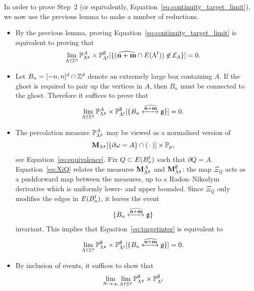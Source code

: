 In order to prove Step~2 (or equivalently, Equation~\eqref{eq:continuity_target_limit}),
we now use the previous lemma to make a number of reductions.
\begin{itemize}
    \item By the previous lemma,
        proving Equation~\eqref{eq:continuity_target_limit} is equivalent to proving that
        \[
            \lim_{\Lambda\uparrow\mathbb Z^d}
            \mathbb P_{\Lambda^\mathfrak g}^A\times\mathbb P_{\Lambda^{\operatorname{f}}}^\emptyset
            [\{(\widehat{\mathbf{n}+\mathbf{m}}\cap E(\Lambda^{\operatorname{f}}))\not\in\mathcal E_A\}]=0.
        \]
    \item Let $B_n=[-n,n]^d\cap \mathbb Z^d$ denote an extremely large box
        containing $A$.
        If the ghost is required to pair up the vertices in $A$,
        then $B_n$ must be connected to the ghost.
        Therefore it suffices to prove that
        \begin{equation}
            \label{eq:targetinter}
            \lim_{\Lambda\uparrow\Z^d}
            \P_{\Lambda^\frakg}^A\times\P_{\Lambda^\f}^\emptyset
            [\{B_n \xleftrightarrow{\widehat{\n+\m}}\frakg\}]=0.
        \end{equation}
    \item The percolation measure $\mathbb P_{\Lambda^\mathfrak g}^A$ may be viewed
        as a normalised version of
        \[\mathbf{M}_{\Lambda^\mathfrak g}[\{\partial\omega=A\}\cap(\,\cdot\,)]\times \mathbb P_p,\] see
        Equation~\eqref{eq:equivalence}.
        Fix $Q\subset E(B_n^{\operatorname{f}})$ such that $\partial Q=A$.
        Equation~\eqref{eq:XiQ} relates the measures $\mathbf{M}_{\Lambda^\mathfrak g}^A$
        and $\mathbf{M}_{\Lambda^\mathfrak g}^\emptyset$:
        the map $\Xi_Q$ acts as a pushforward map
        between the measures, up to a Radon--Nikodym derivative which is uniformly
        lower- and upper bounded.
        Since $\Xi_Q$ only modifies the edges in $E(B_n^{\operatorname{f}})$, it leaves the event \[\{B_n
        \xleftrightarrow{\widehat{\mathbf{n}+\mathbf{m}}}\mathfrak g\}\] invariant.
        This implies that Equation~\eqref{eq:targetinter} is equivalent to
        \begin{equation}
            \lim_{\Lambda\uparrow\mathbb Z^d}
            \mathbb P_{\Lambda^\mathfrak g}^\emptyset\times\mathbb P_{\Lambda^{\operatorname{f}}}^\emptyset
            [\{B_n \xleftrightarrow{\widehat{\mathbf{n}+\mathbf{m}}}\mathfrak g\}]=0.
        \end{equation}
    \item
        By inclusion of events, it suffices to show that
        \begin{equation}
            \lim_{N\to\infty}\lim_{\Lambda\uparrow\Z^d}
            \P_{\Lambda^\frakg}^\emptyset\times\P_{\Lambda^\f}^\emptyset

\end{equation}
\end{itemize}
